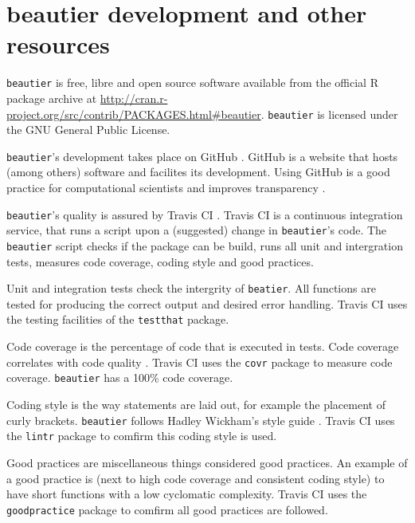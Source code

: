 \documentclass{article}
\begin{document}
\section{beautier development and other resources}

\verb;beautier; is free, libre and open source software available from the official R package archive at 
\url{http://cran.r-project.org/src/contrib/PACKAGES.html\#beautier}.  
\verb;beautier; is licensed under the GNU General Public License.

\verb;beautier;'s development takes place on GitHub \cite{github}. 
GitHub is a website that hosts (among others) software and facilites its development.
Using GitHub is a good practice for computational scientists \cite{perez2016ten} 
and improves transparency \cite{gorgolewski2016practical}.

\verb;beautier;'s quality is assured by Travis CI \cite{travis}. Travis CI is
a continuous integration service, that runs a script upon a (suggested)
change in \verb;beautier;'s code. The \verb;beautier; script checks if the
package can be build, runs all unit and intergration tests, 
measures code coverage, coding style and good practices.

Unit and integration tests check the intergrity of \verb;beatier;. All functions
are tested for producing the correct output and desired error handling. 
Travis CI uses the testing facilities of the \verb;testthat; \cite{testthat} package.

Code coverage is the percentage of code that is executed in tests. 
Code coverage correlates with code quality \cite{del1995correlation}. 
Travis CI uses the \verb;covr; \cite{covr} package to measure code coverage. 
\verb;beautier; has a 100\% code coverage. 

Coding style is the way statements are laid out, for example the placement of 
curly brackets. \verb;beautier; follows Hadley Wickham's style guide \cite{style_guide}. 
Travis CI uses the \verb;lintr; \cite{lintr} package to comfirm this coding style
is used.

Good practices are miscellaneous things considered good practices. An example
of a good practice is (next to high code coverage and consistent coding style) 
to have short functions with a low cyclomatic complexity. Travis CI uses 
the \verb;goodpractice; \cite{goodpractice} package to comfirm all good practices
are followed.
\end{document}
